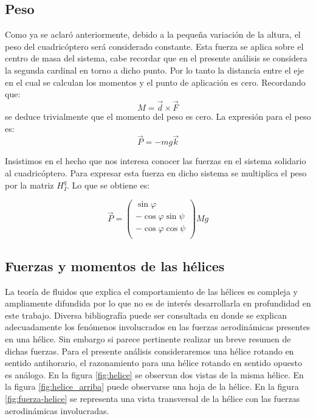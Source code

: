 \documentclass[main]{subfiles}
\begin{document}
\subsection{Peso}
Como ya se aclar\'o anteriormente, debido a la peque\~na variaci\'on de la altura, el peso del cuadric\'optero ser\'a considerado constante. Esta fuerza se aplica sobre el centro de masa del sistema, cabe recordar que en el presente an\'alisis se considera la segunda cardinal en torno a dicho punto. Por lo tanto la distancia entre el eje en el cual se calculan los momentos y el punto de aplicaci\'on es cero. Recordando que: $$
M=\vec{d}\times\vec{F}
$$
se deduce trivialmente que el momento del peso es cero. La expresi\'on para el peso es:
$$
\vec{P}=-mg\vec{k}
$$

Insistimos en el hecho que nos interesa conocer las fuerzas en el sistema solidario al cuadric\'optero. Para expresar esta fuerza en dicho sistema se multiplica el peso por la matriz $H_I^q$. Lo que se obtiene es:

$$
\vec{P}=\left(\begin{array}{c}
\sin\varphi\\
-\cos\varphi\sin\psi\\
-\cos\varphi\cos\psi\\
\end{array}\right)Mg
$$
\subsection{Fuerzas y momentos de las h\'elices}

La teor\'ia de fluidos que explica el comportamiento de las h\'elices es compleja y ampliamente difundida por lo que no es de inter\'es desarrollarla en profundidad en este trabajo. Diversa bibliograf\'ia puede ser consultada en donde se explican adecuadamente los fen\'omenos involucrados en las fuerzas aerodin\'amicas presentes en una h\'elice. Sin embargo si parece pertinente realizar un breve resumen de dichas fuerzas. Para el presente an\'alisis consideraremos una h\'elice rotando en sentido antihorario, el razonamiento para una h\'elice rotando en sentido opuesto es an\'alogo. En la figura \ref{fig:helice} se observan dos vistas de la misma h\'elice. En la figura \ref{fig:helice_arriba} puede observarse una hoja de la h\'elice. En la figura \ref{fig:fuerza-helice} se representa una vista transversal de la h\'elice con las fuerzas aerodin\'amicas involucradas.\\ 
\end{document}
